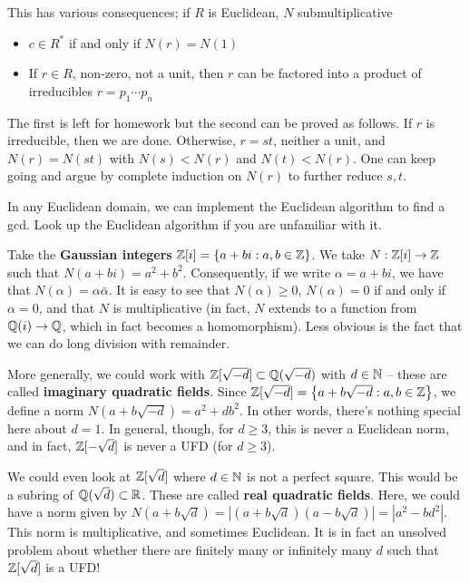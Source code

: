 \documentclass{../mathnotes}
\begin{document}
This has various consequences; if $R$ is Euclidean, $N$ submultiplicative
\begin{itemize}
    \item $c\in R^*$ if and only if $N(r)=N(1)$
    \item If $r\in R$, non-zero, not a unit, then $r$ can be factored into a product of irreducibles $r=p_1\cdots p_n$
\end{itemize}
The first is left for homework but the second can be proved as follows. If $r$ is irreducible, then we are done. Otherwise,
$r=st$, neither a unit, and $N(r)=N(st)$ with $N(s)<N(r)$ and $N(t)<N(r)$. One can keep going and argue by complete induction
on $N(r)$ to further reduce $s,t$.

\begin{rem}
    In any Euclidean domain, we can implement the Euclidean algorithm to find a gcd. Look up the Euclidean algorithm if
    you are unfamiliar with it.
\end{rem}

\begin{exmp}
    Take the \textbf{Gaussian integers} $\mathbb{Z}[i]=\left\{ a+bi:a,b\in\mathbb{Z} \right\}$. We take $N:\mathbb{Z}[i]\to\mathbb{Z}$ such that $N(a+bi)=a^2+b^2$.
    Consequently, if we write $\alpha=a+bi$, we have that $N(\alpha)=\alpha\bar\alpha$. It is easy to see that $N(\alpha)\geq 0$,
    $N(\alpha)=0$ if and only if $\alpha=0$, and that $N$ is multiplicative (in fact, $N$ extends to a function from $\mathbb{Q}(i)\to\mathbb{Q}$,
    which in fact becomes a homomorphism). Less obvious is the fact that we can do long division with remainder.
    
    More generally,
    we could work with $\mathbb{Z}[\sqrt{-d}]\subset\mathbb{Q}(\sqrt{-d})$ with $d\in\mathbb{N}$ -- these are called \textbf{imaginary quadratic fields}.
    Since $\mathbb{Z}[\sqrt{-d}]=\left\{ a+b\sqrt{-d}:a,b\in\mathbb{Z} \right\}$, we define a norm $N(a+b\sqrt{-d})=a^2+db^2$. In other words, there's
    nothing special here about $d=1$. In general, though, for $d\geq 3$, this is never a Euclidean norm, and in fact, $\mathbb{Z}[-\sqrt{d}]$
    is never a UFD (for $d\geq 3$).

    We could even look at $\mathbb{Z}[\sqrt{d}]$ where $d\in\mathbb{N}$ is not a perfect square. This would be a subring of $\mathbb{Q}(\sqrt{d})\subset\mathbb{R}$.
    These are called \textbf{real quadratic fields}. Here, we could have a norm given by $N(a+b\sqrt{d})=|(a+b\sqrt{d})(a-b\sqrt{d})|=
    |a^2-bd^2|$. This norm is multiplicative, and sometimes Euclidean. It is in fact an unsolved problem about whether there
    are finitely many or infinitely many $d$ such that $\mathbb{Z}[\sqrt{d}]$ is a UFD!
\end{exmp}
\end{document}
